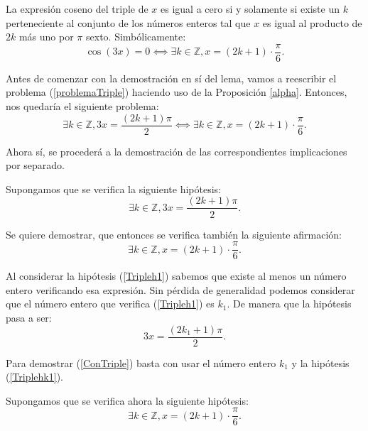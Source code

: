 \begin{lema}[SolucionCosenoTriple]La expresión coseno del
  triple de \(x\) es igual a cero si y solamente si
  existe un \(k\) perteneciente al conjunto de los números
  enteros tal que \(x\) es igual al producto de \(2k\) más
  uno por \(π\) sexto. Simbólicamente:
  \begin{equation}\label{problemaTriple}
    \cos(3x)=0 ⟺ ∃k ∈ ℤ,x=(2k+1)⋅\frac{π}{6}.
  \end{equation}
\end{lema}
\begin{demostracion}
  Antes de comenzar con la demostración en sí del lema, vamos a
  reescribir el problema (\ref{problemaTriple}) haciendo uso de la
  Proposición \ref{alpha}. Entonces, nos quedaría el siguiente
  problema:
  \begin{equation}
    ∃k∈ ℤ,3x=\frac{(2k+1)π}{2}⟺ ∃k ∈ ℤ,x=(2k+1)⋅\frac{π}{6}.
  \end{equation}

  Ahora sí, se procederá a la demostración de las correspondientes
  implicaciones por separado.

  \noindent
  \framebox{\longrightarrow}
  Supongamos que se verifica la siguiente hipótesis:
  \begin{equation}\label{Tripleh1}\tag{h1}
    ∃k∈ ℤ,3x=\frac{(2k+1)π}{2}.
  \end{equation}

  Se quiere demostrar, que entonces se verifica también la
  siguiente afirmación:
  \begin{equation}\label{ConTriple}
     ∃k ∈ ℤ,x=(2k+1)⋅\frac{π}{6}.
   \end{equation}

   Al considerar la hipótesis (\ref{Tripleh1}) sabemos que existe
   al menos un número entero verificando esa expresión. Sin
   pérdida de generalidad podemos considerar que el número entero
   que verifica (\ref{Tripleh1}) es \(k_1\). De manera que la
   hipótesis pasa a ser:
   \begin{equation}\label{Triplehk1}\tag{hk1}
    3x=\frac{(2k_1+1)π}{2}.
  \end{equation}

  Para demostrar (\ref{ConTriple}) basta con usar el número
  entero \(k_1\) y la hipótesis (\ref{Triplehk1}).

   \noindent
   \framebox{\longleftarrow}
   Supongamos que se verifica ahora la siguiente hipótesis:
   \begin{equation}\label{Tripleh2}\tag{h2}
     ∃k ∈ ℤ,x=(2k+1)⋅\frac{π}{6}.
  \end{equation}


\end{demostracion}
